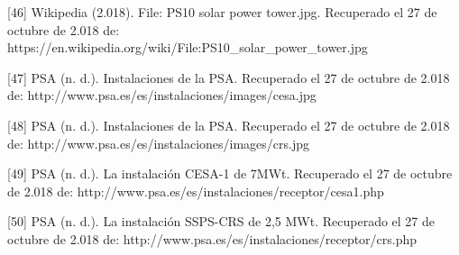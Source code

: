 \documentclass[12pt]{article}
\begin{document}
[46] Wikipedia (2.018). File: PS10 solar power tower.jpg. Recuperado el 27 de octubre de 2.018 de: https://en.wikipedia.org/wiki/File:PS10\_solar\_power\_tower.jpg

[47] PSA (n. d.). Instalaciones de la PSA. Recuperado el 27 de octubre de 2.018 de: http://www.psa.es/es/instalaciones/images/cesa.jpg

[48] PSA (n. d.). Instalaciones de la PSA. Recuperado el 27 de octubre de 2.018 de: http://www.psa.es/es/instalaciones/images/crs.jpg

[49] PSA (n. d.). La instalación CESA-1 de 7MWt. Recuperado el 27 de octubre de 2.018 de: http://www.psa.es/es/instalaciones/receptor/cesa1.php

[50] PSA (n. d.). La instalación SSPS-CRS de 2,5 MWt. Recuperado el 27 de octubre de 2.018 de: http://www.psa.es/es/instalaciones/receptor/crs.php
\end{document}
